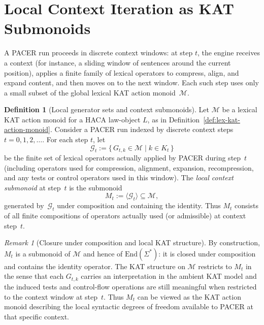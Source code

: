 \documentclass[11pt]{book}
\theoremstyle{plain}
\theoremstyle{definition}
\newtheorem{definition}[theorem]{Definition}
\theoremstyle{remark}
\newtheorem{remark}[theorem]{Remark}
\begin{document}
\section{Local Context Iteration as KAT Submonoids}


A PACER run proceeds in discrete context windows: at step $t$, the
engine receives a context (for instance, a sliding window of sentences
around the current position), applies a finite family of lexical
operators to compress, align, and expand content, and then moves on to
the next window. Each such step uses only a small subset of the global
lexical KAT action monoid~$\mathcal{M}$.

\begin{definition}[Local generator sets and context submonoids]
\label{def:local-context-submonoid}
Let $\mathcal{M}$ be a lexical KAT action monoid for a HACA law-object
$L$, as in Definition~\ref{def:lex-kat-action-monoid}. Consider a
PACER run indexed by discrete context steps $t=0,1,2,\dots$. For each
step $t$, let
\[
  \mathcal{G}_t
  :=
  \{\, G_{t,k}\in\mathcal{M} \mid k\in K_t \,\}
\]
be the finite set of lexical operators actually applied by PACER
during step~$t$ (including operators used for compression, alignment,
expansion, recompression, and any tests or control operators used in
this window). The \emph{local context submonoid} at step~$t$ is the
submonoid
\[
  M_t
  :=
  \langle \mathcal{G}_t\rangle
  \subseteq \mathcal{M},
\]
generated by~$\mathcal{G}_t$ under composition and containing the
identity. Thus $M_t$ consists of all finite compositions of operators
actually used (or admissible) at context step~$t$.
\end{definition}

\begin{remark}[Closure under composition and local KAT structure]
\label{rem:local-closure}
By construction, $M_t$ is a submonoid of $\mathcal{M}$ and hence of
$\mathrm{End}(\Sigma^*)$: it is closed under composition and contains
the identity operator. The KAT structure on $\mathcal{M}$ restricts to
$M_t$ in the sense that each $G_{t,k}$ carries an interpretation in the
ambient KAT model and the induced tests and control-flow operations are
still meaningful when restricted to the context window at step~$t$.
Thus $M_t$ can be viewed as the KAT action monoid describing the local
syntactic degrees of freedom available to PACER at that specific
context.
\end{remark}
\end{document}
